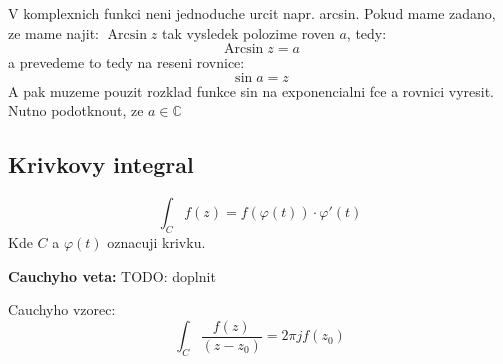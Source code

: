 V komplexnich funkci neni jednoduche urcit napr. arcsin. Pokud mame zadano, ze mame najit:
$\operatorname{Arcsin} z$ tak vysledek polozime roven $a$, tedy:
$$\operatorname{Arcsin} z =a $$
a prevedeme to tedy na reseni rovnice:
$$\operatorname{sin} a = z$$
A pak muzeme pouzit rozklad funkce sin na exponencialni fce a rovnici vyresit. Nutno podotknout, ze $a \in \mathbb{C}$

\subsection*{Krivkovy integral}

$$\int_C f(z) = f(\varphi(t))\cdot \varphi ' (t)$$
Kde $C$ a $\varphi(t)$ oznacuji krivku.

\textbf{Cauchyho veta:}
TODO: doplnit

Cauchyho vzorec:
\begin{equation}
\label{eq:cauchyho}
\int_C \frac{f(z)}{(z-z_0)} = 2\pi j f(z_0)
\end{equation}
